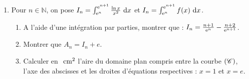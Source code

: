 \begin{enumerate}
                  On prendra : $\ln 2 = 0,69$ ; $e = 2,71$ ; $\alpha = 0,67$ et $f(\alpha) = 3,16$ pour la construction.
            \item Pour $n \in \mathbb{N}$, on pose 
                  $I_n = \int_{\mathrm{e}^{n}}^{\mathrm{e}^{n+1}} \frac{\ln x}{x^2} ~\mathrm{d}x$ et $I_n = \int_{\mathrm{e}^{n}}^{\mathrm{e}^{n+1}} f(x) ~\mathrm{d}x$.
                  \begin{enumerate}
                        \item A l'aide d'une int\'egration par parties, montrer que : 
                              $I_n = \frac{n+1}{\mathrm{e}^{n}} - \frac{n+2}{\mathrm{e}^{n+1}}$.
                        \item Montrer que $A_n = I_n + e$.
                        \item Calculer en $~\mathrm{cm}^2$ l'aire du domaine plan compris entre la courbe $(\mathscr{C})$,
                              l'axe des abscisses et les droites d'\'equations respectives : $x = 1$ et $x = e$.
                  \end{enumerate}
      \end{enumerate}







